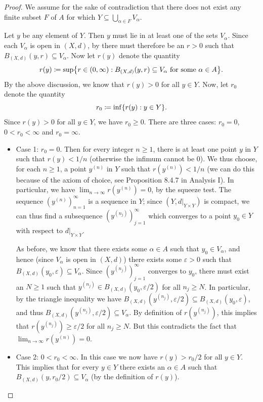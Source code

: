 \begin{proof}
  We assume for the sake of contradiction that there does not exist any finite subset \(F\) of \(A\) for which \(Y \subseteq \bigcup_{\alpha \in F} V_{\alpha}\).

  Let \(y\) be any element of \(Y\).
  Then \(y\) must lie in at least one of the sets \(V_{\alpha}\).
  Since each \(V_{\alpha}\) is open in \((X, d)\), by  there must therefore be an \(r > 0\) such that \(B_{(X, d)}(y, r) \subseteq V_{\alpha}\).
  Now let \(r(y)\) denote the quantity
  \[
    r(y) \coloneqq \sup\set{r \in (0, \infty) : B_{(X, d)}(y, r) \subseteq V_{\alpha} \text{ for some } \alpha \in A}.
  \]
  By the above discussion, we know that \(r(y) > 0\) for all \(y \in Y\).
  Now, let \(r_0\) denote the quantity
  \[
    r_0 \coloneqq \inf\set{r(y) : y \in Y}.
  \]
  Since \(r(y) > 0\) for all \(y \in Y\), we have \(r_0 \geq 0\).
  There are three cases: \(r_0 = 0\), \(0 < r_0 < \infty\) and \(r_0 = \infty\).
  \begin{itemize}
    \item Case 1:
          \(r_0 = 0\).
          Then for every integer \(n \geq 1\), there is at least one point \(y\) in \(Y\) such that \(r(y) < 1 / n\) (otherwise the infimum cannot be \(0\)).
          We thus choose, for each \(n \geq 1\), a point \(y^{(n)}\) in \(Y\) such that \(r(y^{(n)}) < 1 / n\)
          (we can do this because of the axiom of choice, see Proposition 8.4.7 in Analysis I).
          In particular, we have \(\lim_{n \to \infty} r(y^{(n)}) = 0\), by the squeeze test.
          The sequence \((y^{(n)})_{n = 1}^\infty\) is a sequence in \(Y\);
          since \((Y, d|_{Y \times Y})\) is compact, we can thus find a subsequence \((y^{(n_j)})_{j = 1}^\infty\) which converges to a point \(y_0 \in Y\) with respect to \(d|_{Y \times Y}\).

          As before, we know that there exists some \(\alpha \in A\) such that \(y_0 \in V_{\alpha}\), and hence (since \(V_{\alpha}\) is open in \((X, d)\)) there exists some \(\varepsilon > 0\) such that \(B_{(X, d)}(y_0, \varepsilon) \subseteq V_{\alpha}\).
          Since \((y^{(n_j)})_{j = 1}^\infty\) converges to \(y_0\), there must exist an \(N \geq 1\) such that \(y^{(n_j)} \in B_{(X, d)}(y_0, \varepsilon / 2)\) for all \(n_j \geq N\).
          In particular, by the triangle inequality we have \(B_{(X, d)}(y^{(n_j)}, \varepsilon / 2) \subseteq B_{(X, d)}(y_0, \varepsilon)\), and thus \(B_{(X, d)}(y^{(n_j)}, \varepsilon / 2) \subseteq V_{\alpha}\).
          By definition of \(r(y^{(n_j)})\), this implies that \(r(y^{(n_j)}) \geq \varepsilon / 2\) for all \(n_j \geq N\).
          But this contradicts the fact that \(\lim_{n \to \infty} r(y^{(n)}) = 0\).
    \item Case 2:
          \(0 < r_0 < \infty\).
          In this case we now have \(r(y) > r_0 / 2\) for all \(y \in Y\).
          This implies that for every \(y \in Y\) there exists an \(\alpha \in A\) such that \(B_{(X, d)}(y, r_0 / 2) \subseteq V_{\alpha}\) (by the definition of \(r(y)\)).


\end{itemize}
\end{proof}

